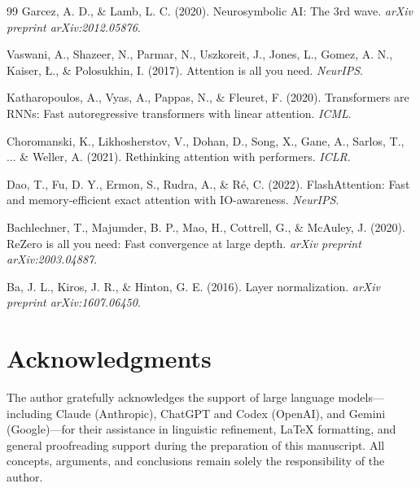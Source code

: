 \documentclass[11pt,a4paper]{article}
\begin{document}
\begin{thebibliography}{99}
Garcez, A. D., \& Lamb, L. C. (2020).
Neurosymbolic AI: The 3rd wave.
\textit{arXiv preprint arXiv:2012.05876}.

Vaswani, A., Shazeer, N., Parmar, N., Uszkoreit, J., Jones, L., Gomez, A. N., Kaiser, Ł., \& Polosukhin, I. (2017).
Attention is all you need.
\textit{NeurIPS}.

Katharopoulos, A., Vyas, A., Pappas, N., \& Fleuret, F. (2020).
Transformers are RNNs: Fast autoregressive transformers with linear attention.
\textit{ICML}.

Choromanski, K., Likhosherstov, V., Dohan, D., Song, X., Gane, A., Sarlos, T., ... \& Weller, A. (2021).
Rethinking attention with performers.
\textit{ICLR}.

Dao, T., Fu, D. Y., Ermon, S., Rudra, A., \& Ré, C. (2022).
FlashAttention: Fast and memory-efficient exact attention with IO-awareness.
\textit{NeurIPS}.

Bachlechner, T., Majumder, B. P., Mao, H., Cottrell, G., \& McAuley, J. (2020).
ReZero is all you need: Fast convergence at large depth.
\textit{arXiv preprint arXiv:2003.04887}.

Ba, J. L., Kiros, J. R., \& Hinton, G. E. (2016).
Layer normalization.
\textit{arXiv preprint arXiv:1607.06450}.
\end{thebibliography}

\section*{Acknowledgments}
The author gratefully acknowledges the support of large language models---including Claude (Anthropic), ChatGPT and Codex (OpenAI), and Gemini (Google)---for their assistance in linguistic refinement, LaTeX formatting, and general proofreading support during the preparation of this manuscript.
All concepts, arguments, and conclusions remain solely the responsibility of the author.
\end{document}
